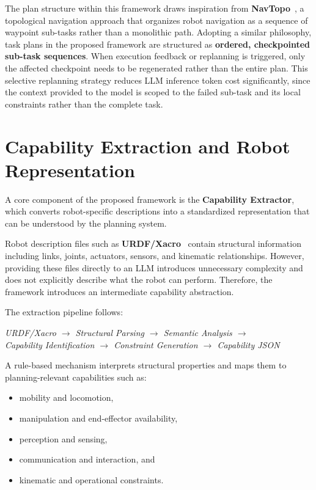 \documentclass[12pt,a4paper]{article}
\begin{document}
The plan structure within this framework draws inspiration from \textbf{NavTopo}~\cite{navtopo}, a topological navigation approach that organizes robot navigation as a sequence of waypoint sub-tasks rather than a monolithic path.
Adopting a similar philosophy, task plans in the proposed framework are structured as \textbf{ordered, checkpointed sub-task sequences}.
When execution feedback or replanning is triggered, only the affected checkpoint needs to be regenerated rather than the entire plan.
This selective replanning strategy reduces LLM inference token cost significantly, since the context provided to the model is scoped to the failed sub-task and its local constraints rather than the complete task.

\section{Capability Extraction and Robot Representation}

A core component of the proposed framework is the \textbf{Capability Extractor}, which converts robot-specific descriptions into a standardized representation that can be understood by the planning system.

Robot description files such as \textbf{URDF/Xacro}~\cite{urdf} contain structural information including links, joints, actuators, sensors, and kinematic relationships.
However, providing these files directly to an LLM introduces unnecessary complexity and does not explicitly describe what the robot can perform.
Therefore, the framework introduces an intermediate capability abstraction.

The extraction pipeline follows:

\begin{center}
\textit{URDF/Xacro $\rightarrow$ Structural Parsing $\rightarrow$ Semantic Analysis $\rightarrow$}\\[4pt]
\textit{Capability Identification $\rightarrow$ Constraint Generation $\rightarrow$ Capability JSON}
\end{center}

A rule-based mechanism interprets structural properties and maps them to planning-relevant capabilities such as:

\begin{itemize}
  \item mobility and locomotion,
  \item manipulation and end-effector availability,
  \item perception and sensing,
  \item communication and interaction, and
  \item kinematic and operational constraints.
\end{itemize}
\end{document}
